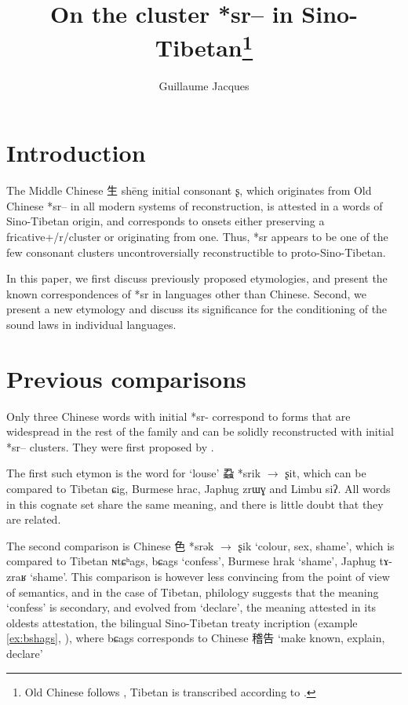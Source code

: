 \documentclass[oldfontcommands,oneside,a4paper,11pt]{article}
\newcommand{\ipa}[1]{{\phon #1}} %
\newcommand{\zh}[1]{{\cn #1}}
\begin{document}
 


\title{On the cluster *sr-- in Sino-Tibetan\footnote{Old Chinese follows \citealt{bs14oc}, Tibetan is transcribed according to \citet{jacques12transcription}.}}
\author{Guillaume Jacques}
\maketitle

\section{Introduction}

The Middle Chinese \zh{生} shēng initial consonant \ipa{ʂ}, which originates from Old Chinese *\ipa{sr--} in all modern systems of reconstruction, is attested in a words of Sino-Tibetan origin, and corresponds to onsets either preserving a fricative+/r/cluster or originating from one. Thus, *sr appears to be  one of the few consonant clusters uncontroversially reconstructible to proto-Sino-Tibetan. 

In this paper, we first discuss previously proposed etymologies, and present the known correspondences of *sr in languages other than Chinese. Second, we present a new etymology and discuss its significance for the conditioning of the sound laws in individual languages.

\section{Previous comparisons} \label{sec:previous}
Only three Chinese words with initial *\ipa{sr-} correspond to forms that are widespread in the rest of the family and can be solidly reconstructed with initial *\ipa{sr--} clusters.  They were first proposed by \citet{benedict72}.

The first such etymon is the word for `louse' \zh{蝨} *\ipa{srik} $\rightarrow$ \ipa{ʂit}, which can be compared to Tibetan \ipa{ɕig}, Burmese \ipa{hrac}, Japhug \ipa{zrɯɣ} and Limbu \ipa{siʔ}. All words in this cognate set share the same meaning, and there is little doubt that they are related.

The second comparison is Chinese \zh{色} *\ipa{srək} $\rightarrow$ \ipa{ʂik} `colour, sex, shame', which is compared to Tibetan \ipa{ɴtɕʰags}, \ipa{bɕags} `confess', Burmese \ipa{hrak} `shame', Japhug \ipa{tɤ-zraʁ} `shame'. This comparison is however less convincing from the point of view of semantics, and in the case of Tibetan, philology suggests that the meaning `confess' is secondary, and evolved from `declare', the meaning attested in its oldests attestation, the bilingual Sino-Tibetan treaty incription (example \ref{ex:bshags}, \citealt[40,80]{licoblin87}), where 	\ipa{bɕags} corresponds to Chinese \zh{稽告} `make known, explain, declare' 
\end{document}

